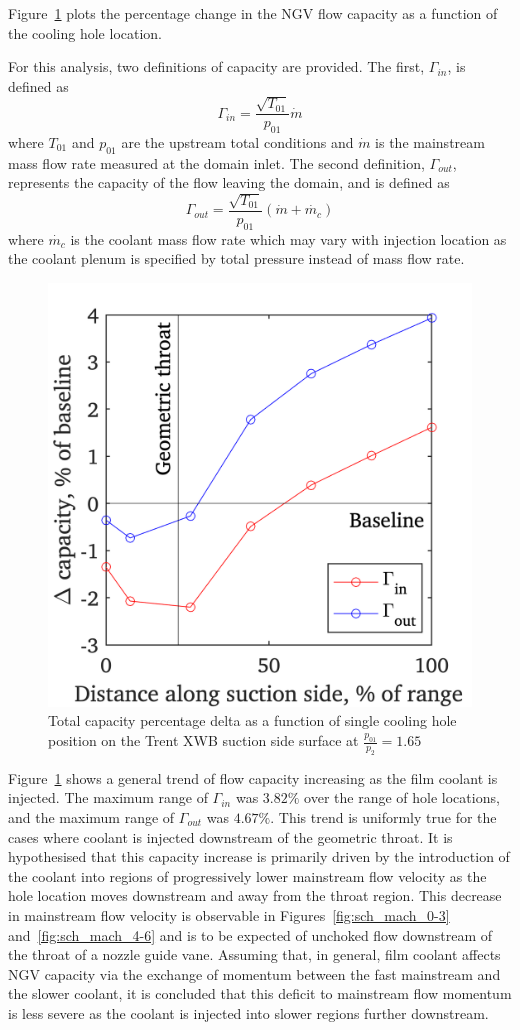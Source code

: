 \documentclass[a4paper, 11pt, oneside]{report}
\begin{document}
Figure~\ref{fig:sch_hole_location_vs_capacity} plots the percentage change in the NGV flow capacity as a function of the cooling hole location. 

For this analysis, two definitions of capacity are provided. The first, $\Gamma_{in}$, is defined as
\begin{equation}
\Gamma_{in} =
\frac{\sqrt{T_{01}}}{p_{01}}
\dot{m}
\end{equation}
where $T_{01}$ and $p_{01}$ are the upstream total conditions and $\dot{m}$ is the mainstream mass flow rate measured at the domain inlet. The second definition, $\Gamma_{out}$, represents the capacity of the flow leaving the domain, and is defined as
\begin{equation}
\Gamma_{out} =
\frac{\sqrt{T_{01}}}{p_{01}}
\left(
\dot{m}
+
\dot{m_c}
\right)
\end{equation}
where $\dot{m_c}$ is the coolant mass flow rate which may vary with injection location as the coolant plenum is specified by total pressure instead of mass flow rate.

\begin{figure}[H]
      \centering
      \includegraphics[width=.45\textwidth]{figs/sch_hole_location_vs_capacity.png}
      \caption{Total capacity percentage delta as a function of single cooling hole position on the Trent XWB suction side surface at $\frac{p_{01}}{p_2}=1.65$}
      \label{fig:sch_hole_location_vs_capacity}
\end{figure}

Figure~\ref{fig:sch_hole_location_vs_capacity} shows a general trend of flow capacity increasing as the film coolant is injected. The maximum range of $\Gamma_{in}$ was $3.82\%$ over the range of hole locations, and the maximum range of $\Gamma_{out}$ was $4.67\%$. This trend is uniformly true for the cases where coolant is injected downstream of the geometric throat. It is hypothesised that this capacity increase is primarily driven by the introduction of the coolant into regions of progressively lower mainstream flow velocity as the hole location moves downstream and away from the throat region. This decrease in mainstream flow velocity is observable in Figures~\ref{fig:sch_mach_0-3} and~\ref{fig:sch_mach_4-6} and is to be expected of unchoked flow downstream of the throat of a nozzle guide vane. Assuming that, in general, film coolant affects NGV capacity via the exchange of momentum between the fast mainstream and the slower coolant, it is concluded that this deficit to mainstream flow momentum is less severe as the coolant is injected into slower regions further downstream.
\end{document}
